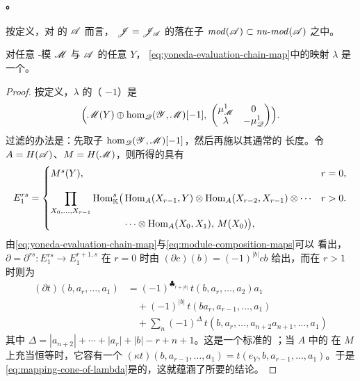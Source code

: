 \paragraph{\trYonedaEmbedding。}\label{sub:cunital-yoneda-embedding}
按定义，对 \trCunital{}的 $\mathscr{A}$ 而言，\trYonedaEmbedding{}%
$\mathscr{J}=\mathscr{J}_{\mathscr{A}}$ 的\trImage{}落在子\trCategory{}%
$\mathit{mod}(\mathscr{A})\subset\mathit{nu}\text{-}\mathit{mod}(\mathscr{A})$ 之中。

\begin{lemma}\label{thm:yoneda-evaluation-quasiisomorphism}
对任意 \trCunital{} \trAinfty-模 $\mathscr{M}$ 与 $\mathscr{A}$ 的任意\trObject{} $Y$，
\eqref{eq:yoneda-evaluation-chain-map}中的映射 $\lambda$ 是一个\trQuasiisomorphism。
\end{lemma}
\begin{proof}
按定义，$\lambda$ 的\trMappingCone{}（\trSuspension{} $-1$）是\trChainComplex
\begin{equation}\label{eq:mapping-cone-of-lambda}
\Bigl(\mathscr{M}(Y)\oplus\hom_{\mathscr{Q}}(\mathscr{Y},\mathscr{M})[-1],\;
\begin{pmatrix}
\mu^1_{\mathscr{M}} & 0\\
\lambda & -\mu^1_{\mathscr{Q}}
\end{pmatrix}\Bigr).
\end{equation}
过滤的办法是：先取子\trComplex{} $\hom_{\mathscr{Q}}(\mathscr{Y},\mathscr{M})[-1]$，然后再施以其通常的
长度\trFiltration。令 $A=H(\mathscr{A})$、$M=H(\mathscr{M})$，则所得的\trSpectralSequence{}具有
\begin{equation*}
E_1^{rs}=
\begin{cases}
M^s(Y), & r=0,\\[2.5ex]
\begin{aligned}[t]\displaystyle
\prod_{X_0,\ldots,X_{r-1}}\operatorname{Hom}^{s}_{\mathbb{K}}\bigl(
&\operatorname{Hom}_A(X_{r-1},Y)\otimes\operatorname{Hom}_A(X_{r-2},X_{r-1})\otimes\cdots\\
&\cdots\otimes\operatorname{Hom}_A(X_0,X_1),\,M(X_0)\bigr),
\end{aligned}
& r>0.
\end{cases}
\end{equation*}
由\eqref{eq:yoneda-evaluation-chain-map}与\eqref{eq:module-composition-maps}可以
看出，\trDifferential{} $\partial=\partial^{rs}\colon E_1^{rs}\to E_1^{r+1,s}$ 在 $r=0$ 时由
$(\partial c)(b)=(-1)^{|b|}cb$ 给出，而在 $r>1$ 时则为
\begin{equation*}
\begin{split}
(\partial t)(b,a_r,\ldots,a_1)
&=(-1)^{\clubsuit_{r+|b|}}\,t(b,a_r,\ldots,a_2)a_1\\
&\quad+(-1)^{|b|}\,t(ba_r,a_{r-1},\ldots,a_1)\\
&\quad+\sum_n(-1)^{\Delta}\,t(b,a_r,\ldots,a_{n+2}a_{n+1},\ldots,a_1)
\end{split}
\end{equation*}
其中 $\Delta=|a_{n+2}|+\cdots+|a_r|+|b|-r+n+1$。这是一个标准的 \trBarResolution；当 $A$ 中的%
\trIdentityMorphism{}在 $M$ 上充当恒等时，它容有一个\trContractingHomotopy{}%
$(\kappa t)(b,a_{r-1},\ldots,a_1)=t(e_Y,b,a_{r-1},\ldots,a_1)$。于是
\eqref{eq:mapping-cone-of-lambda}是\trAcyclic{}的，这就蕴涵了所要的结论。
\end{proof}

